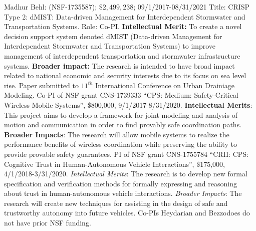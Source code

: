 Madhur Behl: (NSF-1735587); $\$2,499,238$; 09/1/2017-08/31/2021 Title: CRISP Type 2: dMIST: Data-driven Management for Interdependent Stormwater and Transportation Systems. Role: Co-PI. \textbf{Intellectual Merit:} To create a novel decision support system denoted dMIST (Data-driven Management for Interdependent Stormwater and Transportation Systems) to improve management of interdependent transportation and stormwater infrastructure systems. %
\textbf{Broader impact:} The research is intended to have broad impact related to national economic and security interests due to its focus on sea level rise. Paper submitted to $11^{th}$ International Conference on Urban Drainiage Modeling. 
Co-PI of NSF grant CNS-1739333 ``CPS: Medium: Safety-Critical Wireless Mobile Systems'', \$800,000, 9/1/2017-8/31/2020. \textbf{Intellectual Merits}: This project aims to develop a framework for joint modeling and analysis of motion and communication in order to find provably safe coordination paths. \textbf{Broader Impacts}: The research will allow mobile systems to realize the performance benefits of wireless coordination while preserving the ability to provide provable safety guarantees. 
PI of NSF grant CNS-1755784 ``CRII: CPS: Cognitive Trust in Human-Autonomous Vehicle Interactions'', \$175,000, 4/1/2018-3/31/2020.
\emph{Intellectual Merits}: The research is to develop new formal specification and verification methods for formally expressing and reasoning about trust in human-autonomous vehicle interactions.
\emph{Broader Impacts}: The research will create new techniques for assisting in the design of safe and trustworthy autonomy into future vehicles.
Co-PIs Heydarian and Bezzodoes do not have prior NSF funding. 
